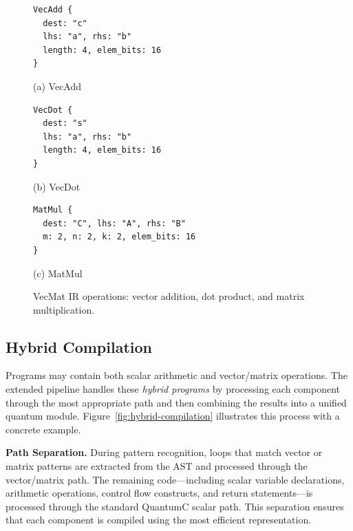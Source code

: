\begin{figure}[htb]
\begin{minipage}{0.48\columnwidth}
\begin{lstlisting}[style=mlirstyle]
VecAdd {
  dest: "c"
  lhs: "a", rhs: "b"
  length: 4, elem_bits: 16
}
\end{lstlisting}
\centering\small (a) VecAdd
\end{minipage}
\hfill
\begin{minipage}{0.48\columnwidth}
\begin{lstlisting}[style=mlirstyle]
VecDot {
  dest: "s"
  lhs: "a", rhs: "b"
  length: 4, elem_bits: 16
}
\end{lstlisting}
\centering\small (b) VecDot
\end{minipage}

\vspace{0.5em}

\begin{minipage}{\columnwidth}
\begin{lstlisting}[style=mlirstyle]
MatMul {
  dest: "C", lhs: "A", rhs: "B"
  m: 2, n: 2, k: 2, elem_bits: 16
}
\end{lstlisting}
\centering\small (c) MatMul
\end{minipage}
\caption{VecMat IR operations: vector addition, dot product, and matrix multiplication.}
\label{fig:ir-examples}
\end{figure}




\subsection{Hybrid Compilation}
\label{sec:hybrid}


Programs may contain both scalar arithmetic and vector/matrix operations. The extended pipeline handles these \emph{hybrid programs} by processing each component through the most appropriate path and then combining the results into a unified quantum module. Figure~\ref{fig:hybrid-compilation} illustrates this process with a concrete example.



\textbf{Path Separation.} During pattern recognition, loops that match vector or matrix patterns are extracted from the AST and processed through the vector/matrix path. The remaining code---including scalar variable declarations, arithmetic operations, control flow constructs, and return statements---is processed through the standard QuantumC scalar path. This separation ensures that each component is compiled using the most efficient representation.

